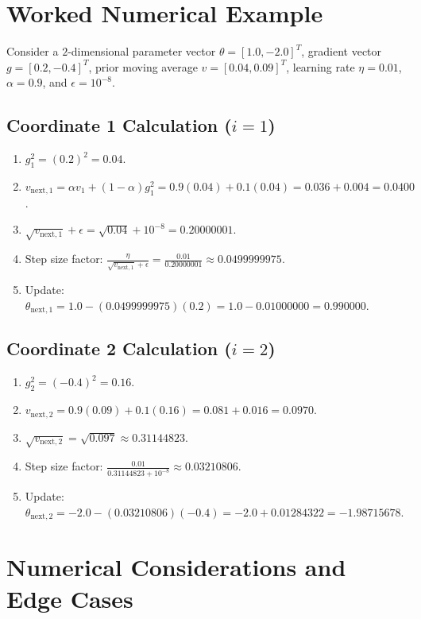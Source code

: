 \documentclass[11pt,a4paper]{article}
\theoremstyle{definition}
\begin{document}
\section{Worked Numerical Example}

Consider a $2$-dimensional parameter vector $\theta = [1.0, -2.0]^T$, gradient vector $g = [0.2, -0.4]^T$, prior moving average $v = [0.04, 0.09]^T$, learning rate $\eta = 0.01$, $\alpha = 0.9$, and $\epsilon = 10^{-8}$.

\subsection{Coordinate 1 Calculation ($i=1$)}
\begin{enumerate}
    \item $g_1^2 = (0.2)^2 = 0.04$.
    \item $v_{\text{next}, 1} = \alpha v_1 + (1 - \alpha) g_1^2 = 0.9(0.04) + 0.1(0.04) = 0.036 + 0.004 = 0.0400$.
    \item $\sqrt{v_{\text{next}, 1}} + \epsilon = \sqrt{0.04} + 10^{-8} = 0.20000001$.
    \item Step size factor: $\frac{\eta}{\sqrt{v_{\text{next}, 1}} + \epsilon} = \frac{0.01}{0.20000001} \approx 0.0499999975$.
    \item Update: $\theta_{\text{next}, 1} = 1.0 - (0.0499999975)(0.2) = 1.0 - 0.01000000 = 0.990000$.
\end{enumerate}

\subsection{Coordinate 2 Calculation ($i=2$)}
\begin{enumerate}
    \item $g_2^2 = (-0.4)^2 = 0.16$.
    \item $v_{\text{next}, 2} = 0.9(0.09) + 0.1(0.16) = 0.081 + 0.016 = 0.0970$.
    \item $\sqrt{v_{\text{next}, 2}} = \sqrt{0.097} \approx 0.31144823$.
    \item Step size factor: $\frac{0.01}{0.31144823 + 10^{-8}} \approx 0.03210806$.
    \item Update: $\theta_{\text{next}, 2} = -2.0 - (0.03210806)(-0.4) = -2.0 + 0.01284322 = -1.98715678$.
\end{enumerate}

\section{Numerical Considerations and Edge Cases}
\end{document}
